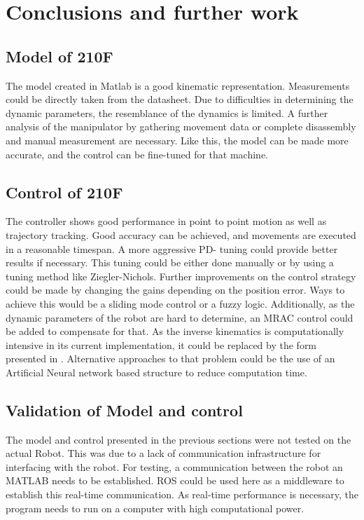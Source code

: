 \chapter{Conclusions and further work}

\section{Model of 210F}
The model created in Matlab is a good kinematic representation. Measurements could be directly taken from the datasheet. Due to difficulties in determining the dynamic parameters, the resemblance of the dynamics is limited.   A further analysis of the manipulator by gathering movement data or complete disassembly and manual measurement are necessary. Like this, the model can be made more accurate, and the control can be fine-tuned for that machine.\\

\section{Control of 210F}
The controller shows good performance in point to point motion as well as trajectory tracking. Good accuracy can be achieved, and movements are executed in a reasonable timespan. A more aggressive PD- tuning could provide better results if necessary. This tuning could be either done manually or by using a tuning method like Ziegler-Nichols.
Further improvements on the control strategy could be made by changing the gains depending on the position error. Ways to achieve this would be a sliding mode control or a fuzzy logic. Additionally, as the dynamic parameters of the robot are hard to determine, an MRAC control could be added to compensate for that. 
As the inverse kinematics is computationally intensive in its current implementation, it could be replaced by the form presented in . Alternative approaches to that problem could be the use of an Artificial Neural network based structure to reduce computation time. 

\section{Validation of Model and control}
The model and control presented in the previous sections were not tested on the actual Robot. This was due to a lack of communication infrastructure for interfacing with the robot. For testing, a communication between the robot an MATLAB needs to be established. \ac{ROS} could be used here as a middleware to establish this real-time communication. As real-time performance is necessary, the program needs to run on a computer with high computational power.\\

